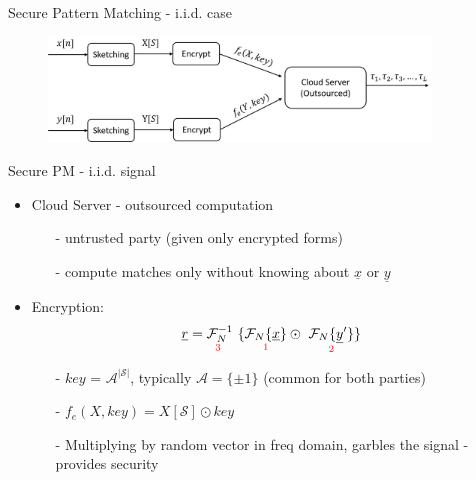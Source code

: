 \documentclass[10pt,xcolor=table]{beamer}
\newcommand{\xv}{\underline{x}}
\newcommand{\yv}{\underline{y}}
\newcommand{\rv}{\underline{r}}
\begin{document}
\begin{frame}{Secure Pattern Matching - i.i.d. case}
\begin{figure}
	\centering
	\includegraphics[width=4.0in]{securePM_iid.png}
\end{figure}
\begin{block}{Secure PM - i.i.d. signal}
	\begin{itemize}
		\item Cloud Server - outsourced computation
		\begin{itemize}
			\item[-] untrusted party (given only encrypted forms)
			\item[-] compute matches only without knowing about $\xv$ or $\yv$
		\end{itemize}
		\item Encryption:
			$$\rv = \underset{\text{\color{red} 3 } } {\mathcal{F}_{N}^{-1}} \ \{ \underset{\text{ \color{red} 1 } }{  \mathcal{F}_{N}\{\xv\}}  \odot \ \underset{\text{ \color{red} 2 } }{ \mathcal{F}_{N}\{\yv'\}}  \}$$
		\vspace{-5pt}
		\begin{itemize}
			\item[-] $key$ = $\mathcal{A}^{|\mathcal{S}|}$, typically $\mathcal{A} = \{\pm 1\}$ (common for both parties)
			\item[-] $f_e(X,key) = X[\mathcal{S}] \odot key
			$
			\item[-] Multiplying by random vector in freq domain, garbles the signal - provides security 
		\end{itemize}
	\end{itemize}
\end{block}
\end{frame}
\end{document}
